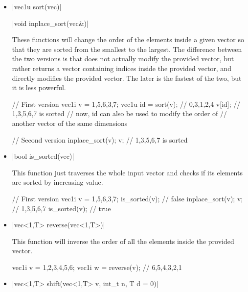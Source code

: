 \documentclass[12pt]{report}
\newenvironment{example}
{
    \begin{mdframed}[style=example,frametitle={Example}]
}
{
    \end{mdframed}
}
\begin{document}
\begin{itemize}
\item \cppinline|vec1u sort(vec)| 

\cppinline|void inplace_sort(vec&)| 

These functions will change the order of the elements inside a given vector so that they are sorted from the smallest to the largest. The difference between the two versions is that  does not actually modify the provided vector, but rather returns a vector containing indices inside the provided vector, and  directly modifies the provided vector. The later is the fastest of the two, but it is less powerful.

\begin{example}
\begin{cppcode}
// First version
vec1i v = {1,5,6,3,7};
vec1u id = sort(v); // {0,3,1,2,4}
v[id]; // {1,3,5,6,7} is sorted
// now, id can also be used to modify the order of
// another vector of the same dimensions

// Second version
inplace_sort(v);
v; // {1,3,5,6,7} is sorted
\end{cppcode}
\end{example}

\item \cppinline|bool is_sorted(vec)| 

This function just traverses the whole input vector and checks if its elements are sorted by increasing value.

\begin{example}
\begin{cppcode}
// First version
vec1i v = {1,5,6,3,7};
is_sorted(v); // false
inplace_sort(v);
v; // {1,3,5,6,7}
is_sorted(v); // true
\end{cppcode}
\end{example}

\item \cppinline|vec<1,T> reverse(vec<1,T>)| 

This function will inverse the order of all the elements inside the provided vector.

\begin{example}
\begin{cppcode}
vec1i v = {1,2,3,4,5,6};
vec1i w = reverse(v); // {6,5,4,3,2,1}
\end{cppcode}
\end{example}

\item \cppinline|vec<1,T> shift(vec<1,T> v, int_t n, T d = 0)| 


\end{itemize}
\end{document}
